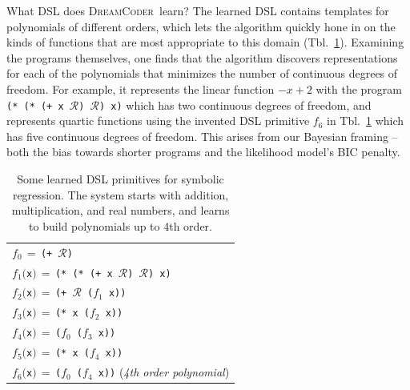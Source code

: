 \documentclass{article}
\newcommand{\system}{\textsc{DreamCoder}~}
\newcommand{\code}[1]{{\footnotesize\texttt{#1}}}
\newcommand{\probability}{\mathds{P}} %
\begin{document}

What DSL does \system learn?
The learned DSL contains templates for polynomials of different orders,
which lets the algorithm quickly hone in on the kinds of functions that are most appropriate to this domain (Tbl.~\ref{regressionDSL}).
Examining the programs themselves,
one finds that the algorithm discovers representations for each of the polynomials that minimizes the number of continuous degrees of freedom.
For example, it represents the linear function $-x+2$ with the program
\code{(* (* (+ x }$\mathcal{R}$\code{) }$\mathcal{R}$\code{) x)} which has two continuous degrees of freedom, and represents quartic functions using the invented DSL primitive $f_6$ in Tbl.~\ref{regressionDSL}
which has five continuous degrees of freedom.
This arises from our Bayesian framing -- both the bias towards shorter programs and the likelihood model's BIC penalty.
\begin{table}\centering
\begin{tabular}{l}
  \toprule
  $f_0\,=\,$\code{(+ $\mathcal{R}$)}\\
  $f_1($\code{x}$)\,=\,$\code{(* (* (+ x $\mathcal{R}$) $\mathcal{R}$) x)} \\
  $f_2($\code{x}$)\,=\,$\code{(+ $\mathcal{R}$ ($f_1$ x))} \\
  $f_3($\code{x}$)\,=\,$\code{(* x ($f_2$ x))}\\
  $f_4($\code{x}$)\,=\,$\code{($f_0$ ($f_3$ x))}\\
  $f_5($\code{x}$)\,=\,$\code{(* x ($f_4$ x))}\\
  $f_6($\code{x}$)\,=\,$\code{($f_0$ ($f_4$ x))} (\emph{4th order polynomial})
  \\\bottomrule
\end{tabular}
\caption{Some learned DSL primitives for symbolic regression. The system starts with addition, multiplication, and real numbers, and learns to build polynomials up to 4th order.}\label{regressionDSL}
\end{table}
\end{document}
